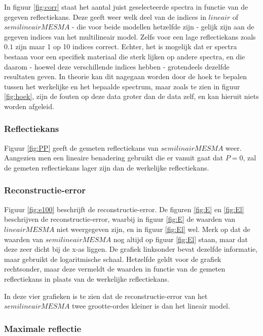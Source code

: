 \documentclass[12pt]{report}
\begin{document}
In figuur \ref{fig:corr} staat het aantal juist geselecteerde spectra in functie van de gegeven reflectiekans. Deze geeft weer welk deel van de indices in $lineair$ of $semilineair MESMA$ - die voor beide modellen hetzelfde zijn - gelijk zijn aan de gegeven indices van het multilineair model. Zelfs voor een lage reflectiekans zoals $0.1$ zijn maar 1 op 10 indices correct. Echter, het is mogelijk dat er spectra bestaan voor een specifiek materiaal die sterk lijken op andere spectra, en die daarom - hoewel deze verschillende indices hebben - grotendeels dezelfde resultaten geven. In theorie kan dit nagegaan worden door de hoek te bepalen tussen het werkelijke en het bepaalde spectrum, maar zoals te zien in figuur \ref{fig:hoek}, zijn de fouten op deze data groter dan de data zelf, en kan hieruit niets worden afgeleid. 


\subsubsection{Reflectiekans}
Figuur \ref{fig:PP} geeft de gemeten reflectiekans van $semilinair MESMA$ weer. Aangezien men een lineaire benadering gebruikt die er vanuit gaat dat $P=0$, zal de gemeten reflectiekans lager zijn dan de werkelijke reflectiekans.

\subsubsection{Reconstructie-error}

Figuur \ref{fig:e100} beschrijft de reconstructie-error. De figuren \ref{fig:E} en \ref{fig:El} beschrijven de reconstructie-error, waarbij in figuur \ref{fig:E} de waarden van $lineair MESMA$ niet weergegeven zijn, en in figuur \ref{fig:El} wel. Merk op dat de waarden van $semilineair MESMA$ nog altijd op figuur \ref{fig:El} staan, maar dat deze zeer dicht bij de x-as liggen. De grafiek linksonder bevat dezelfde informatie, maar gebruikt de logaritmische schaal. Hetzelfde geldt voor de grafiek rechtsonder, maar deze vermeldt de waarden in functie van de gemeten reflectiekans in plaats van de werkelijke reflectiekans. 

In deze vier grafieken is te zien dat de reconstructie-error van het $semilineair MESMA$ twee grootte-ordes kleiner is dan het lineair model. 


\subsubsection{Maximale reflectie}
\end{document}
